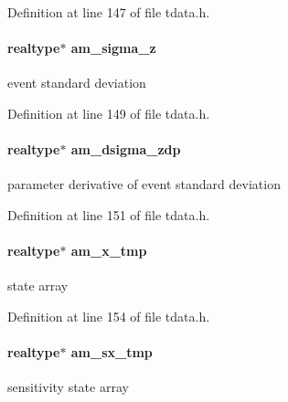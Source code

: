 Definition at line 147 of file tdata.\+h.

\hypertarget{struct_temp_data_a6326bdfdde6ff9d3e52a80760e403a02}{}
\paragraph[{am\+\_\+sigma\+\_\+z}]{\setlength{\rightskip}{0pt plus 5cm}realtype$\ast$ am\+\_\+sigma\+\_\+z}\label{struct_temp_data_a6326bdfdde6ff9d3e52a80760e403a02}
event standard deviation 

Definition at line 149 of file tdata.\+h.

\hypertarget{struct_temp_data_ad918e459ea613f39e2d2a2fe62b68137}{}
\paragraph[{am\+\_\+dsigma\+\_\+zdp}]{\setlength{\rightskip}{0pt plus 5cm}realtype$\ast$ am\+\_\+dsigma\+\_\+zdp}\label{struct_temp_data_ad918e459ea613f39e2d2a2fe62b68137}
parameter derivative of event standard deviation 

Definition at line 151 of file tdata.\+h.

\hypertarget{struct_temp_data_a7751aebb2b290fc4a51d9ca5f47fb455}{}
\paragraph[{am\+\_\+x\+\_\+tmp}]{\setlength{\rightskip}{0pt plus 5cm}realtype$\ast$ am\+\_\+x\+\_\+tmp}\label{struct_temp_data_a7751aebb2b290fc4a51d9ca5f47fb455}
state array 

Definition at line 154 of file tdata.\+h.

\hypertarget{struct_temp_data_a4b0bde10a390f324386b07acacd367bc}{}
\paragraph[{am\+\_\+sx\+\_\+tmp}]{\setlength{\rightskip}{0pt plus 5cm}realtype$\ast$ am\+\_\+sx\+\_\+tmp}\label{struct_temp_data_a4b0bde10a390f324386b07acacd367bc}
sensitivity state array 


